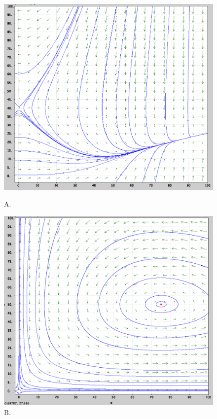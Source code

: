 \documentclass[11pt]{article}
\begin{document}
\begin{enumerate}
	\begin{figure}[h]
		  \includegraphics[width=\linewidth]{fig1}
		  \caption{A.}
	\endminipage\hfill
		  \includegraphics[width=\linewidth]{fig2}
		  \caption{B.}
		  \label{}
	\endminipage\hfill

\end{figure}
\end{enumerate}
\end{document}
